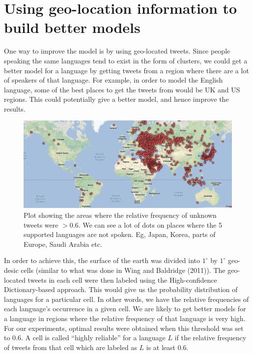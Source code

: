 \documentclass[11pt]{article}
\begin{document}
\section{Using geo-location information to build better models}
One way to improve the model is by using geo-located tweets. Since people speaking the same languages tend to exist in the form of clusters, we could get a better model for a language by getting tweets from a region where there are a lot of speakers of that language. For example, in order to model the English language, some of the best places to get the tweets from would be UK and US regions. This could potentially give a better model, and hence improve the results.

\begin{figure}[ht]
\includegraphics[scale=0.5]{unknown_plot.png}
\caption{\footnotesize Plot showing the areas where the relative frequency of unknown tweets were $> 0.6$. We can see a lot of dots on places where the 5 supported languages are not spoken. Eg, Japan, Korea, parts of Europe, Saudi Arabia etc.}
\label{fig:s4}
\end{figure}

In order to achieve this, the surface of the earth was divided into $1^{\circ}$ by $1^{\circ}$ geo-desic cells (similar to what was done in Wing and Baldridge (2011)). The geo-located tweets in each cell were then labeled using the High-confidence Dictionary-based approach. This would give us the probability distribution of languages for a particular cell. In other words, we have the relative frequencies of each language's occurrence in a given cell. We are likely to get better models for a language in regions where the relative frequency of that language is very high. For our experiments, optimal results were obtained when this threshold was set to 0.6. A cell is called ``highly reliable'' for a language $L$ if the relative frequency of tweets from that cell which are labeled as $L$ is at least 0.6.
\end{document}
